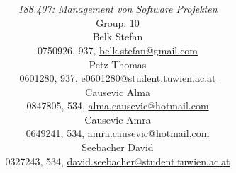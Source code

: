 \documentclass[a4paper,11pt]{article}
\title{\textbf{\sffamily\Huge \ShortTitle}\\ 
{\textbf{\sffamily\Large \FullTitle}}
\vspace{1cm}}
\author{
{\em 188.407: Management von Software Projekten} \vspace{1cm} \\
Group: 10\bigskip \\
Belk Stefan \\ {\small 0750926, 937, \href{mailto:belk.stefan@gmail.com}{belk.stefan@gmail.com}}\\
Petz Thomas \\ {\small 0601280, 937, \href{mailto:e0601280@student.tuwien.ac.at}{e0601280@student.tuwien.ac.at}}\\
Causevic Alma \\ {\small 0847805, 534, \href{mailto:alma.causevic@hotmail.com}{alma.causevic@hotmail.com}}\\ 
Causevic Amra  \\ {\small 0649241, 534, \href{mailto:amra.causevic@hotmail.com}{amra.causevic@hotmail.com}}\\ 
Seebacher David \\ {\small 0327243, 534, \href{mailto:david.seebacher@student.tuwien.ac.at}{david.seebacher@student.tuwien.ac.at}}\\
\vspace{4cm}
}
\providecommand*{\note}[1]{\small \textcolor{RoyalBlue}{\begin{minipage}{\textwidth}{#1}\end{minipage}}}
\begin{document}
\begin{titlepage}
\maketitle

\end{titlepage}


\thispagestyle{empty}
\tableofcontents
\pagebreak

\setcounter{page}{1}



\pagebreak
\end{document}
